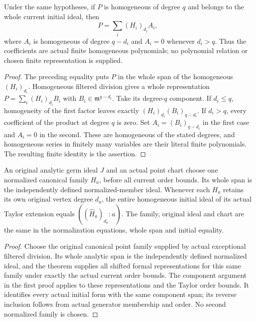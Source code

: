 \begin{theorem}
\label{hir:actual-exceptional-family-homogeneous-multiplier-bands}
\leanok
Under the same hypotheses, if $P$ is homogeneous of degree $q$ and belongs
to the whole current initial ideal, then
\[
 P=\sum_i(H_i)_{d_i}A_i,
\]
where $A_i$ is homogeneous of degree $q-d_i$ and $A_i=0$ whenever
$d_i>q$. Thus the coefficients are actual finite homogeneous polynomials;
no polynomial relation or chosen finite representation is supplied.
\end{theorem}
\begin{proof}
The preceding equality puts $P$ in the whole span of the homogeneous
$(H_i)_{d_i}$. Homogeneous filtered division gives a whole representation
$P=\sum_i(H_i)_{d_i}B_i$ with
$B_i\in\mathfrak m^{q-d_i}$. Take its degree-$q$ component. If $d_i\le q$,
homogeneity of the first factor leaves exactly
$(H_i)_{d_i}(B_i)_{q-d_i}$. If $d_i>q$, every coefficient of the product
at degree $q$ is zero. Set $A_i=(B_i)_{q-d_i}$ in the first case and
$A_i=0$ in the second. These are homogeneous of the stated degrees, and
homogeneous series in finitely many variables are their literal finite
polynomials. The resulting finite identity is the assertion.
\end{proof}

\begin{theorem}
\label{hir:actual-original-point-canonical-current-initial-generation}
\leanok
An original analytic germ ideal $J$ and an actual point chart choose one
normalized canonical family $H_a$, before all current order bounds. Its
whole span is the independently defined normalized-member ideal. Whenever
each $H_a$ retains its own original vertex degree $d_a$, the entire
homogeneous initial ideal of its actual Taylor extension equals
$((\widehat H_a)_{d_a}:a)$. The family, original ideal and chart are the
same in the normalization equations, whole span and initial equality.
\end{theorem}
\begin{proof}
Choose the original canonical point family supplied by actual exceptional
filtered division. Its whole analytic span is the independently defined
normalized ideal, and the theorem supplies all shifted formal representations
for this same family under exactly the actual current order bounds. The
component argument in the first proof applies to these representations and
the Taylor order bounds. It identifies every actual initial form with the
same component span; its reverse inclusion follows from actual generator
membership and order. No second normalized family is chosen.
\end{proof}

